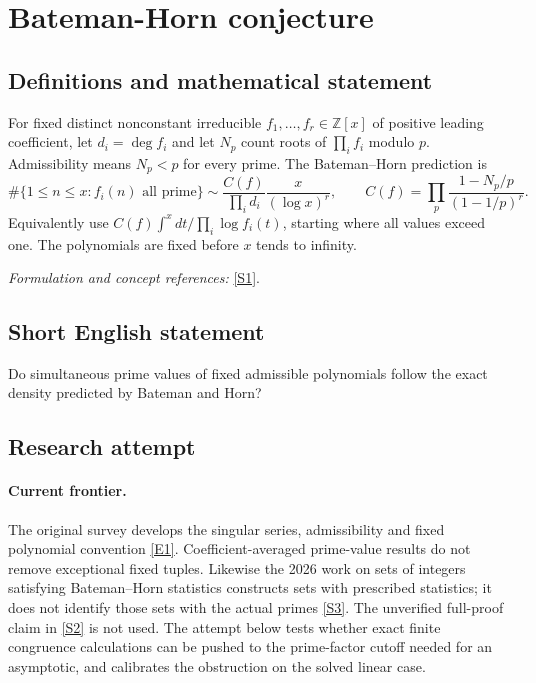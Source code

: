 \documentclass[11pt,a4paper]{article}
\numberwithin{equation}{section}
\newcommand{\Z}{\mathbb{Z}}
\newcommand{\sref}[2]{\hyperlink{source:#1:#2}{[S#2]}}
\newcommand{\eref}[2]{\hyperlink{extra:#1:#2}{[E#2]}}
\newif\ifshowcatalogue
\newcommand{\cataloguescope}[1]{\ifshowcatalogue
 \paragraph{Exact scope in the supplied catalogue.}
 \begin{quote}\small #1\end{quote}\fi}
\begin{document}
\setcounter{section}{82}
\section{\texorpdfstring{Bateman-Horn conjecture}{Bateman-Horn conjecture}}\label{83}
\subsection{Definitions and mathematical statement}
For fixed distinct nonconstant irreducible $f_1,\ldots,f_r\in\Z[x]$ of positive leading coefficient, let $d_i=\deg f_i$ and let $N_p$ count roots of $\prod_i f_i$ modulo $p$. Admissibility means $N_p<p$ for every prime. The Bateman--Horn prediction is
\[
 \#\{1\le n\le x:f_i(n)\text{ all prime}\}
 \sim\frac{C(f)}{\prod_i d_i}\frac{x}{(\log x)^r},\qquad
 C(f)=\prod_p\frac{1-N_p/p}{(1-1/p)^r}.
\]
Equivalently use $C(f)\int^x dt/\prod_i\log f_i(t)$, starting where all values exceed one. The polynomials are fixed before $x$ tends to infinity.
\par\smallskip\textit{Formulation and concept references:} \sref{83}{1}.
\cataloguescope{Prove or disprove the Bateman-Horn asymptotic formula for the number of positive integers n up to x for which any fixed admissible finite family of distinct irreducible integer polynomials with positive leading coefficients are simultaneously prime.}
\subsection{Short English statement}
Do simultaneous prime values of fixed admissible polynomials follow the exact density predicted by Bateman and Horn?
\subsection{Research attempt}

\paragraph{Current frontier.}
The original survey develops the singular series, admissibility and fixed
polynomial convention \eref{83}{1}. Coefficient-averaged prime-value
results do not remove exceptional fixed tuples. Likewise the 2026 work
on sets of integers satisfying Bateman--Horn statistics constructs sets
with prescribed statistics; it does not identify those sets with the
actual primes \sref{83}{3}. The unverified full-proof claim in
\sref{83}{2} is not used. The attempt below tests whether exact finite
congruence calculations can be pushed to the prime-factor cutoff needed
for an asymptotic, and calibrates the obstruction on the solved linear case.
\end{document}
